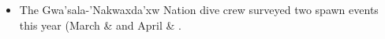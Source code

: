 \begin{itemize}
\item The Gwa'sala-'Nakwaxda'xw Nation dive crew surveyed two spawn events this year
(March  \&  and April  & .
\end{itemize}